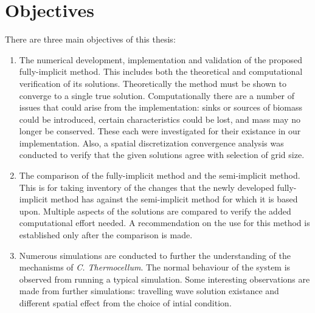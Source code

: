 \section{Objectives}


There are three main objectives of this thesis:
\begin{enumerate}
  \item The numerical development, implementation and validation of the proposed fully-implicit method.
    This includes both the theoretical and computational verification of its solutions.
    Theoretically the method must be shown to converge to a single true solution.
    Computationally there are a number of issues that could arise from the implementation: sinks or sources of biomass could be introduced, certain characteristics could be lost, and mass may no longer be conserved.
    These each were investigated for their existance in our implementation.
    Also, a spatial discretization convergence analysis was conducted to verify that the given solutions agree with selection of grid size.
  
  \item The comparison of the fully-implicit method and the semi-implicit method.
    This is for taking inventory of the changes that the newly developed fully-implicit method has against the semi-implicit method for which it is based upon.
    Multiple aspects of the solutions are compared to verify the added computational effort needed.
    A recommendation on the use for this method is established only after the comparison is made.
  
  \item Numerous simulations are conducted to further the understanding of the mechanisms of \textit{C. Thermocellum}.
    The normal behaviour of the system is observed from running a typical simulation.
    Some interesting observations are made from further simulations: travelling wave solution existance and different spatial effect from the choice of intial condition.
\end{enumerate}

